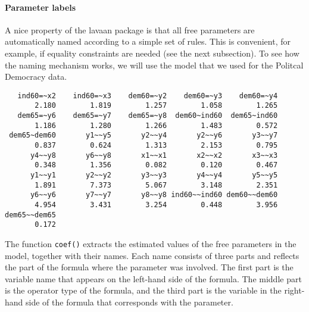 \paragraph{Parameter labels}

A nice property of the lavaan package is that all free parameters are
automatically named according to a simple set of rules. This is
convenient, for example, if equality constraints are needed (see the
next subsection). To see how the naming mechanism works, we will use the
model that we used for the Politcal Democracy data.

\begin{Shaded}
\begin{Highlighting}[]
\StringTok{ }
            
\end{Highlighting}
\end{Shaded}

\begin{verbatim}
   ind60=~x2    ind60=~x3    dem60=~y2    dem60=~y3    dem60=~y4 
       2.180        1.819        1.257        1.058        1.265 
   dem65=~y6    dem65=~y7    dem65=~y8  dem60~ind60  dem65~ind60 
       1.186        1.280        1.266        1.483        0.572 
 dem65~dem60       y1~~y5       y2~~y4       y2~~y6       y3~~y7 
       0.837        0.624        1.313        2.153        0.795 
      y4~~y8       y6~~y8       x1~~x1       x2~~x2       x3~~x3 
       0.348        1.356        0.082        0.120        0.467 
      y1~~y1       y2~~y2       y3~~y3       y4~~y4       y5~~y5 
       1.891        7.373        5.067        3.148        2.351 
      y6~~y6       y7~~y7       y8~~y8 ind60~~ind60 dem60~~dem60 
       4.954        3.431        3.254        0.448        3.956 
dem65~~dem65 
       0.172 
\end{verbatim}

The function \texttt{coef()} extracts the estimated values of the free
parameters in the model, together with their names. Each name consists
of three parts and reflects the part of the formula where the parameter
was involved. The first part is the variable name that appears on the
left-hand side of the formula. The middle part is the operator type of
the formula, and the third part is the variable in the right-hand side
of the formula that corresponds with the parameter.

